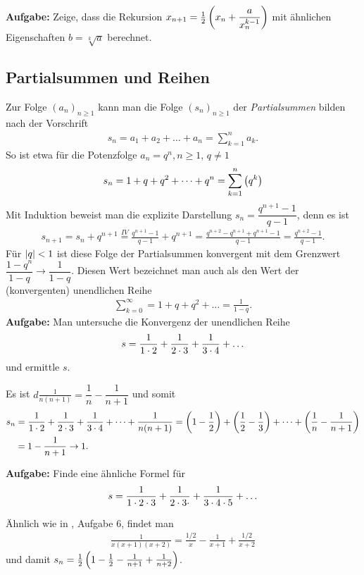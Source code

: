 \documentclass[11pt,a4paper]{article}
\begin{document}
\textbf{Aufgabe:} Zeige, dass die Rekursion
$x_{n+1}=\frac12\left(x_n+\dfrac{a}{x_n^{k-1}}\right)$ mit ähnlichen Eigenschaften
$b=\sqrt[k]{a}$ berechnet. 

\subsection*{Partialsummen und Reihen}

Zur Folge $(a_n)_{n\ge 1}$ kann man die Folge $(s_n)_{n\ge 1}$ der
\emph{Partialsummen} bilden nach der Vorschrift
\begin{gather*}
  s_n=a_1+a_2+\dots+a_n=\sum_{k=1}^n{a_k}.
\end{gather*}
So ist etwa für die Potenzfolge $a_n=q^n, n\ge 1$, $q\ne 1$
\begin{gather*}
  s_n=1+q+q^2+\dots+q^n=\sum_{k=1}^n\left(q^k\right)
\end{gather*}
Mit Induktion beweist man die explizite Darstellung
$s_n=\dfrac{q^{n+1}-1}{q-1}$, denn es ist
\begin{gather*}
  s_{n+1}=s_n+q^{n+1}\stackrel{IV}{=} \frac{q^{n+1}-1}{q-1}+q^{n+1}
  =\frac{q^{n+2}-q^{n+1}+q^{n+1}-1}{q-1}= \frac{q^{n+2}-1}{q-1}. 
\end{gather*}
Für $\left\vert q\right\vert<1$ ist diese Folge der Partialsummen konvergent mit dem Grenzwert
$\dfrac{1-q^n}{1-q}\to \dfrac{1}{1-q}$. Diesen Wert bezeichnet man auch als
den Wert der (konvergenten) unendlichen Reihe
\begin{gather*}
  \sum_{k=0}^\infty=1+q+q^2+\dots = \frac{1}{1-q}.
\end{gather*}
\textbf{Aufgabe:}
Man untersuche die Konvergenz der unendlichen Reihe
\begin{gather*}
  s=\frac{1}{1\cdot 2}+\frac{1}{2\cdot 3}+\frac{1}{3\cdot 4}+\dots
\end{gather*}
und ermittle $s$.  

\begin{loesung}
  Es ist $d\frac{1}{n(n+1)}=\dfrac{1}{n}-\dfrac{1}{n+1}$ und somit
  \begin{align*}
    s_n&=\frac{1}{1\cdot 2}+\frac{1}{2\cdot 3}+\frac{1}{3\cdot
      4}+\dots+\frac{1}{n(n+1)} = \left(1-\frac12\right)+\left(\frac12-\frac13\right)+\dots
    +\left(\frac{1}{n}-\frac{1}{n+1}\right)\\ &= 1-\frac{1}{n+1} \to 1.
  \end{align*}
\end{loesung}

\textbf{Aufgabe:} Finde eine ähnliche Formel für
\begin{gather*}
  s=\frac{1}{1\cdot 2\cdot 3}+\frac{1}{2\cdot 3\cdot }+\frac{1}{3\cdot 4\cdot 5}+\dots
\end{gather*}
\begin{loesung}
  Ähnlich wie in \cite{S}, Aufgabe 6, findet man
  \begin{gather*}
    \frac{1}{x(x+1)(x+2)}=\frac{1/2}{x}-\frac{1}{x+1}+\frac{1/2}{x+2}
  \end{gather*}
  und damit $s_n=\frac12\left(1-\frac12-\frac{1}{n+1}+\frac{1}{n+2}\right)$. 
\end{loesung}
\end{document}
